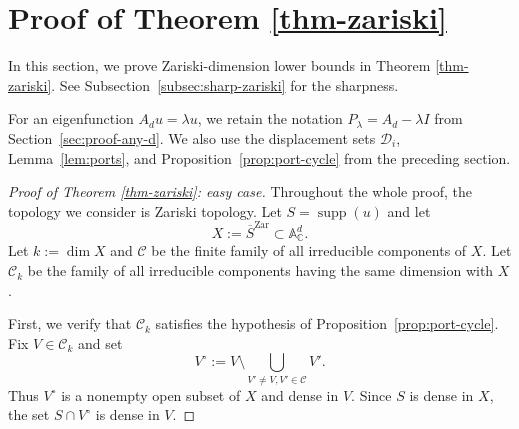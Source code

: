 \documentclass[11pt,reqno]{amsart}
\newcommand\C{\ensuremath{\mathbb{C}}}
\newcommand{\supp}{\operatorname{supp}}
\theoremstyle{definition}
\theoremstyle{plain}
\numberwithin{equation}{section}
\begin{document}
\section{Proof of Theorem \ref{thm-zariski}}\label{sec:zariski}
In this section, we prove Zariski-dimension lower bounds in Theorem \ref{thm-zariski}. See Subsection~\ref{subsec:sharp-zariski} for the sharpness.


For an eigenfunction $A_du=\lambda u$, we retain the notation
$P_\lambda=A_d-\lambda I$ from Section~\ref{sec:proof-any-d}. We also use the displacement
sets $\mathcal D_i$, Lemma~\ref{lem:ports}, and
Proposition~\ref{prop:port-cycle} from the preceding section.



\begin{proof}[Proof of Theorem \ref{thm-zariski}: easy case]
Throughout the whole proof, the topology we consider is Zariski topology.
    Let $S=\supp (u)$ and let 
    \begin{equation*}
        X:=\overline{S}^{\operatorname{Zar}}\subset \mathbb{A}_\C^d.
    \end{equation*}
    Let $k:=\dim X$ and $\mathcal{C}$ be the finite family of all irreducible components of $X$. Let $\mathcal{C}_k$ be the family of all irreducible components having the same dimension with $X$. 
    
    First, we verify that $\mathcal{C}_k$ satisfies the hypothesis of Proposition~\ref{prop:port-cycle}. Fix $V\in \mathcal{C}_k$ and set
    \begin{equation*}
        V^\circ:=V\setminus \bigcup_{V'\neq V,
        V'\in \mathcal{C}}V'.
    \end{equation*}
    Thus $V^\circ$ is a nonempty open subset of $X$ and dense in $V$. Since $S$ is dense in $X$, the set $S\cap V^\circ$ is dense in $V$. 


\end{proof}
\end{document}
